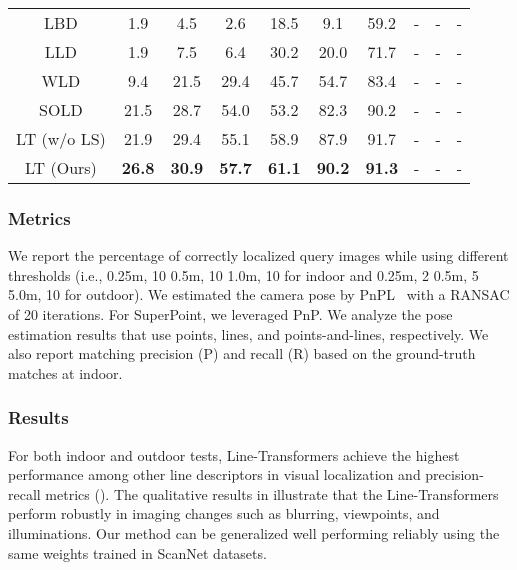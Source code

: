 \documentclass[letterpaper, 10 pt, journal, twoside]{ieeetran}
\begin{document}
\begin{table}[!t]
{\begin{tabular}{cccccccccc}
  LBD                  & 1.9  & 4.5  & 2.6  & 18.5 & 9.1  & 59.2 & - & - & - \\
  LLD                  & 1.9  & 7.5  & 6.4  & 30.2 & 20.0 & 71.7 & - & - & - \\
  WLD                  & 9.4  & 21.5 & 29.4 & 45.7 & 54.7 & 83.4 & - & - & - \\
  SOLD             & 21.5 & 28.7 & 54.0 & 53.2 & 82.3 & 90.2 & - & - & - \\
  LT (w/o LS)          & 21.9 & 29.4 & 55.1 & 58.9 & 87.9 & 91.7 & - & - & - \\
  LT (Ours) & \textbf{26.8} & \textbf{30.9} & \textbf{57.7} & \textbf{61.1} & \textbf{90.2} & \textbf{91.3} & - & - & - \\\hline
\end{tabular}
}
\vspace{-5mm}
\end{table}



\subsubsection{Metrics}

We report the percentage of correctly localized query images while using different thresholds (i.e., 0.25m, 10\textdegree {\slash} 0.5m, 10\textdegree {\slash} 1.0m, 10\textdegree{} for indoor and 0.25m, 2\textdegree {\slash} 0.5m, 5\textdegree {\slash} 5.0m, 10\textdegree{} for outdoor). We estimated the camera pose by \ac{PnPL}~\cite{Agostinho2019} with a \ac{RANSAC} of 20 iterations. For SuperPoint, we leveraged \ac{PnP}. We analyze the pose estimation results that use points, lines, and points-and-lines, respectively. We also report matching precision (P) and recall (R) based on the ground-truth matches at indoor.



\subsubsection{Results}

For both indoor and outdoor tests, Line-Transformers achieve the highest performance among other line descriptors in visual localization and precision-recall metrics (). The qualitative results in  illustrate that the Line-Transformers perform robustly in imaging changes such as blurring, viewpoints, and illuminations. Our method can be generalized well performing reliably using the same weights trained in ScanNet datasets.
\end{document}
